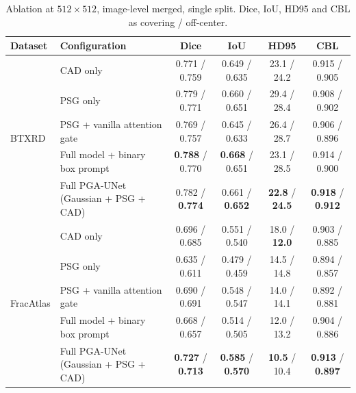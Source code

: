 \begin{table}[t]
\caption{Ablation at $512\times512$, image-level merged, single split. Dice, IoU, HD95 and CBL as covering / off-center.}
\label{tab:ablation}
\centering
\begin{tabular}{llcccc}
\toprule
Dataset & Configuration & Dice & IoU & HD95 & CBL \\
\midrule
\multirow{5}{*}{BTXRD}
& CAD only & 0.771 / 0.759 & 0.649 / 0.635 & 23.1 / 24.2 & 0.915 / 0.905 \\
& PSG only & 0.779 / 0.771 & 0.660 / 0.651 & 29.4 / 28.4 & 0.908 / 0.902 \\
& PSG + vanilla attention gate & 0.769 / 0.757 & 0.645 / 0.633 & 26.4 / 28.7 & 0.906 / 0.896 \\
& Full model + binary box prompt & \textbf{0.788} / 0.770 & \textbf{0.668} / 0.651 & 23.1 / 28.5 & 0.914 / 0.900 \\
& Full PGA-UNet (Gaussian + PSG + CAD) & 0.782 / \textbf{0.774} & 0.661 / \textbf{0.652} & \textbf{22.8} / \textbf{24.5} & \textbf{0.918} / \textbf{0.912} \\
\midrule
\multirow{5}{*}{FracAtlas}
& CAD only & 0.696 / 0.685 & 0.551 / 0.540 & 18.0 / \textbf{12.0} & 0.903 / 0.885 \\
& PSG only & 0.635 / 0.611 & 0.479 / 0.459 & 14.5 / 14.8 & 0.894 / 0.857 \\
& PSG + vanilla attention gate & 0.690 / 0.691 & 0.548 / 0.547 & 14.0 / 14.1 & 0.892 / 0.881 \\
& Full model + binary box prompt & 0.668 / 0.657 & 0.514 / 0.505 & 12.0 / 13.2 & 0.904 / 0.886 \\
& Full PGA-UNet (Gaussian + PSG + CAD) & \textbf{0.727} / \textbf{0.713} & \textbf{0.585} / \textbf{0.570} & \textbf{10.5} / 10.4 & \textbf{0.913} / \textbf{0.897} \\
\bottomrule
\end{tabular}
\end{table}

